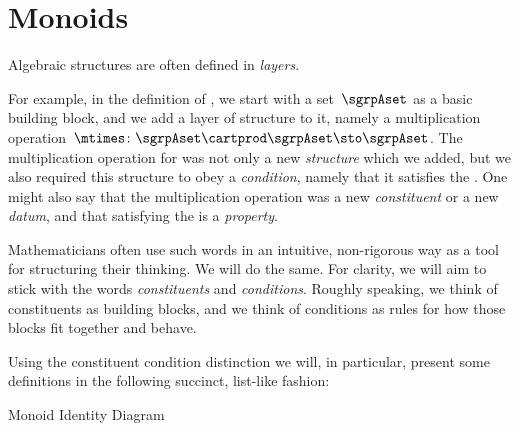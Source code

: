 
\section{Monoids}
\label{sec:parallelism-monoids}

Algebraic structures are often defined in \emph{layers}.

For example, in the definition of , we start with a set~$\sgrpAset$ as a basic building block, and we add a layer of structure to it, namely a multiplication operation~$\mtimes \colon \sgrpAset \cartprod \sgrpAset \sto \sgrpAset$.
The multiplication operation for  was not only a new \emph{structure} which we added, but we also required this structure to obey a \emph{condition}, namely that it satisfies the .
One might also say that the multiplication operation was a new \emph{constituent} or a new \emph{datum}, and that satisfying the  is a \emph{property}.

Mathematicians often use such words in an intuitive, non-rigorous way as a tool for structuring their thinking.
We will do the same.
For clarity, we will aim to stick with the words \emph{constituents} and \emph{conditions}.
Roughly speaking, we think of constituents as building blocks, and we think of conditions as rules for how those blocks fit together and behave.

Using the constituent \vs condition distinction we will, in particular, present some definitions in the following succinct, list-like fashion:

\begin{marginfigure}
    \centering
    \caption{Monoid Identity Diagram}
    \label{fig:monoid-diagram}
\end{marginfigure}

